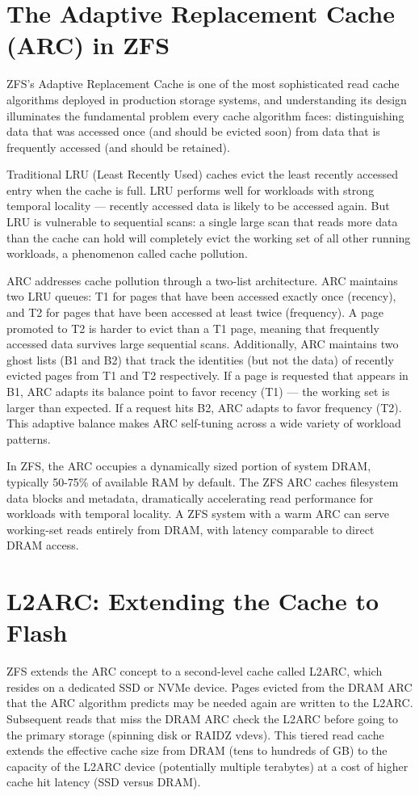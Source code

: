 \section{The Adaptive Replacement Cache (ARC) in ZFS}
ZFS's Adaptive Replacement Cache is one of the most sophisticated read cache algorithms deployed in production storage systems, and understanding its design illuminates the fundamental problem every cache algorithm faces: distinguishing data that was accessed once (and should be evicted soon) from data that is frequently accessed (and should be retained).

Traditional LRU (Least Recently Used) caches evict the least recently accessed entry when the cache is full. LRU performs well for workloads with strong temporal locality --- recently accessed data is likely to be accessed again. But LRU is vulnerable to sequential scans: a single large scan that reads more data than the cache can hold will completely evict the working set of all other running workloads, a phenomenon called cache pollution.

ARC addresses cache pollution through a two-list architecture. ARC maintains two LRU queues: T1 for pages that have been accessed exactly once (recency), and T2 for pages that have been accessed at least twice (frequency). A page promoted to T2 is harder to evict than a T1 page, meaning that frequently accessed data survives large sequential scans. Additionally, ARC maintains two ghost lists (B1 and B2) that track the identities (but not the data) of recently evicted pages from T1 and T2 respectively. If a page is requested that appears in B1, ARC adapts its balance point to favor recency (T1) --- the working set is larger than expected. If a request hits B2, ARC adapts to favor frequency (T2). This adaptive balance makes ARC self-tuning across a wide variety of workload patterns.

In ZFS, the ARC occupies a dynamically sized portion of system DRAM, typically 50-75\% of available RAM by default. The ZFS ARC caches filesystem data blocks and metadata, dramatically accelerating read performance for workloads with temporal locality. A ZFS system with a warm ARC can serve working-set reads entirely from DRAM, with latency comparable to direct DRAM access.

\section{L2ARC: Extending the Cache to Flash}
ZFS extends the ARC concept to a second-level cache called L2ARC, which resides on a dedicated SSD or NVMe device. Pages evicted from the DRAM ARC that the ARC algorithm predicts may be needed again are written to the L2ARC. Subsequent reads that miss the DRAM ARC check the L2ARC before going to the primary storage (spinning disk or RAIDZ vdevs). This tiered read cache extends the effective cache size from DRAM (tens to hundreds of GB) to the capacity of the L2ARC device (potentially multiple terabytes) at a cost of higher cache hit latency (SSD versus DRAM).

